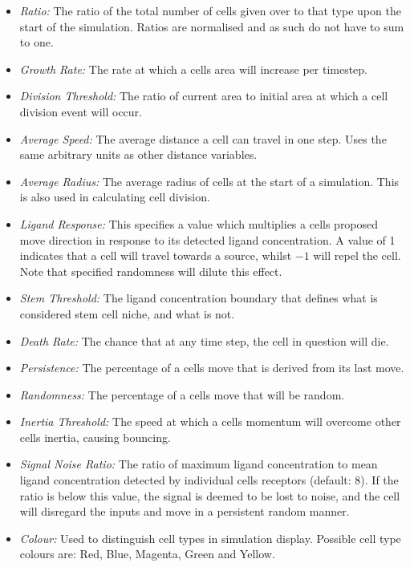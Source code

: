 \documentclass[12pt]{article}
\begin{document}
\begin{itemize}
\item {\itshape Ratio: }The ratio of the total number of cells given 
over to that type upon the start of the simulation. Ratios are 
normalised and as such do not have to sum to one.
\item {\itshape Growth Rate: }The rate at which a cells area will 
increase per timestep.
\item {\itshape Division Threshold: }The ratio of current area to 
initial area at which a cell division event will occur.
\item {\itshape Average Speed: }The average distance a cell can travel 
in one step. Uses the same arbitrary units as other distance variables.
\item {\itshape Average Radius: }The average radius of cells at the 
start of a simulation. This is also used in calculating cell division.
\item {\itshape Ligand Response: }This specifies a value which 
multiplies a cells proposed move direction in response to its detected 
ligand concentration. A value of 1 indicates that a cell will travel 
towards a source, whilst \(-1\) will repel the cell. Note that specified 
randomness will dilute this effect.
\item {\itshape Stem Threshold: }The ligand concentration boundary that 
defines what is considered stem cell niche, and what is not.
\item {\itshape Death Rate: }The chance that at any time step, the cell 
in question will die.
\item {\itshape Persistence: }The percentage of a cells move that is 
derived from its last move.
\item {\itshape Randomness: }The percentage of a cells move that will be 
random.
\item {\itshape Inertia Threshold: }The speed at which a cells momentum 
will overcome other cells inertia, causing bouncing.
\item {\itshape Signal Noise Ratio: }The ratio of maximum ligand 
concentration to mean ligand concentration detected by individual cells 
receptors (default: 8). If the ratio is below this value, the signal is 
deemed to be lost to noise, and the cell will disregard the inputs and 
move in a persistent random manner.
\item {\itshape Colour:} Used to distinguish cell types in simulation 
display. Possible cell type colours are: Red, Blue, Magenta, Green and 
Yellow.

\end{itemize}
\end{document}
